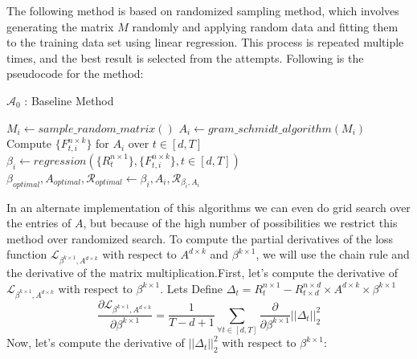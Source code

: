  The following method is based on randomized sampling method, which involves generating the matrix $M$ randomly and applying random data and fitting them to the training data set using linear regression. This process is repeated multiple times, and the best result is selected from the attempts.
Following is the pseudocode for the method:
\begin{algorithm}[H]
\caption{$\mathcal{A}_{0}$ : Baseline Method}\label{lfm_baseline_method}
\begin{algorithmic}[1]
    \State $M_i \gets sample\_random\_matrix()$
    \State $A_i \gets gram\_schmidt\_algorithm(M_i)$
    \State Compute $\{F^{n\times k}_{t, i}\}$ for $A_i$ over $t\in [d,T]$
    \State $\beta_i \gets regression(\{R^{n\times 1}_{t}\},\{F^{n\times k}_{t, i}\}, t\in [d,T])$
      
        \State $\beta_{optimal}, A_{optimal}, \mathcal{R}_{optimal} \gets \beta_{i}, A_{i}, \mathcal{R}_{\beta_i, A_i} $
    \EndIf 
\EndFor
\end{algorithmic}
\end{algorithm} In an alternate implementation of this algorithms we can even do grid search over the entries of $A$, but because of the high number of possibilities we restrict this method over randomized search. 
To compute the partial derivatives of the loss function $\mathcal{L}_{\beta^{k \times 1}, A^{d\times k}}$ with respect to $A^{d\times k}$ and $\beta^{k \times 1}$, we will use the chain rule and the derivative of the matrix multiplication.\newline \newline First, let's compute the derivative of $\mathcal{L}_{\beta^{k \times 1}, A^{d\times k}}$ with respect to $\beta^{k \times 1}$. Lets Define $\Delta_t = R^{n\times 1}_t-R^{n\times d}_{t\times d}\times A^{d\times k} \times \beta^{k \times 1}$
\begin{equation}
    \frac{\partial \mathcal{L}_{\beta^{k \times 1}, A^{d\times k}}}{\partial \beta^{k \times 1}} = \frac{1}{T-d+1} \sum_{\forall t\in [d,T]} \frac{\partial}{\partial \beta^{k \times 1}} ||\Delta_t||_2^2 
\end{equation}
\newline Now, let's compute the derivative of $||\Delta_t||_2^2$ with respect to $\beta^{k\times 1}$:

